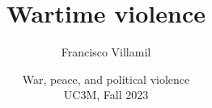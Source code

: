 \documentclass[aspectratio=43]{beamer}
\title{\huge Wartime violence}
\author{Francisco Villamil}
\date{War, peace, and political violence\\UC3M, Fall 2023}
\begin{document}
\begin{frame}
  \titlepage
\end{frame}
\end{document}
